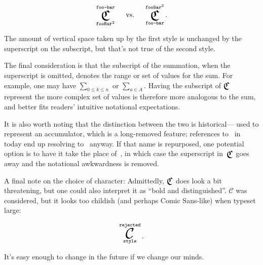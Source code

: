 \begin{equation*}
  \Classify^\texttt{foo-bar}_{\texttt{fooBar}^2}
  \mspace{25mu}\text{vs.}\mspace{25mu}
  \Classify_\texttt{foo-bar}^{\texttt{fooBar}^2}.
\end{equation*}

The amount of vertical space taken up by the first style is unchanged by the
  superscript on the subscript,
    but that's not true of the second style.

The final consideration is that the subscript of the summation,
  when the superscript is omitted,
  denotes the range or set of values for the sum.
For example,
  one may have $\sum_{0\leq k \leq n}$ or
  $\sum_{a\in A}$.
Having the subscript of $\Classify$ represent the more complex set of values
  is therefore more analogous to the sum,
    and better fits readers' intuitive notational expectations.

It is also worth noting that the distinction between the two is historical---%
   used to represent an accumulator,
    which is a long-removed feature;
      references to~ in \tame{} today end up resolving
      to~ anyway.
If that name is repurposed,
  one potential option is to have it take the place of~,
    in which case the superscript in~$\Classify$ goes away and the
      notational awkwardness is removed.

A final note on the choice of character:
Admittedly, $\Classify$ does look a bit threatening,
  but one could also interpret it as ``bold and distinguished''.
$\mathcal{C}$ was considered,
  but it looks too childish (and perhaps Comic Sans-like) when typeset large:

\begin{equation*}
  \displaystyle\mathop{\hbox{\huge$\mathcal{C}$}}^\texttt{rejected}_\texttt{style}.
\end{equation*}

It's easy enough to change in the future if we change our minds.
